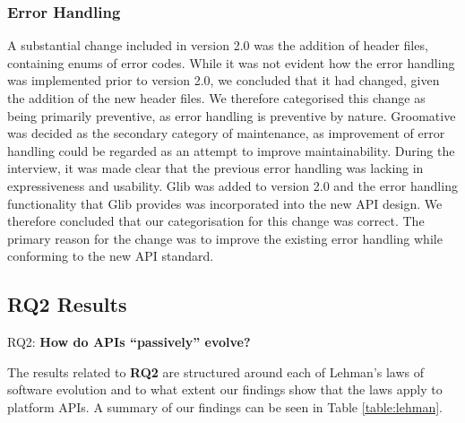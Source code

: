 \documentclass{sig-alternate}
\begin{document}
\subsubsection{Error Handling} %
A substantial change included in version 2.0 was the addition of header files, containing enums of error codes. While it was not evident how the error handling was implemented prior to version 2.0, we concluded that it had changed, given the addition of the new header files. We therefore categorised this change as being primarily preventive, as error handling is preventive by nature. Groomative was decided as the secondary category of maintenance, as improvement of error handling could be regarded as an attempt to improve maintainability.  During the interview, it was made clear that the previous error handling was lacking in expressiveness and usability. Glib was added to version 2.0 and the error handling functionality that Glib provides was incorporated into the new API design. We therefore concluded that our categorisation for this change was correct. The primary reason for the change was to improve the existing error handling while conforming to the new API standard. 



\subsection{RQ2 Results} \label{results_rq2} %
\noindent
RQ2: \textbf{How do APIs ``passively'' evolve?}
\smallskip

The results related to \textbf{RQ2} are structured around each of Lehman's laws of software evolution \cite{lehman1980programs} and to what extent our findings show that the laws apply to platform APIs. A summary of our findings can be seen in Table \ref{table:lehman}. 
\end{document}
